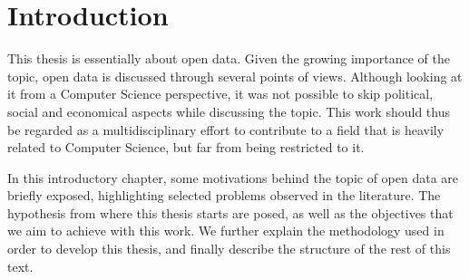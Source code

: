 \chapter{Introduction}

This thesis is essentially about open data.
Given the growing importance of the topic, open data is discussed through several points of views.
Although looking at it from a Computer Science perspective, it was not possible to skip political, social and economical aspects while discussing the topic.
This work should thus be regarded as a multidisciplinary effort to contribute to a field that is heavily related to Computer Science, but far from being restricted to it.

In this introductory chapter, some motivations behind the topic of open data are briefly exposed, highlighting selected problems observed in the literature.
The hypothesis from where this thesis starts are posed, as well as the objectives that we aim to achieve with this work.
We further explain the methodology used in order to develop this thesis, and finally describe the structure of the rest of this text.

